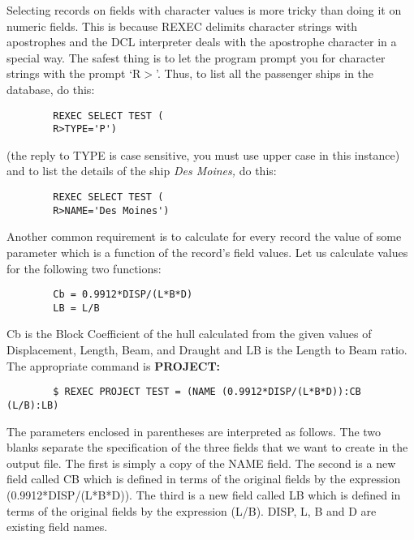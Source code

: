Selecting records on fields with character values is more tricky than doing it
on numeric fields.
This is because REXEC delimits character strings with apostrophes and the DCL
interpreter deals with the apostrophe character in a special way.
The safest thing is to let the program prompt you for character strings with
the prompt `R$>$'.
Thus, to list all the passenger ships in the database, do this:
\begin{verbatim}
        REXEC SELECT TEST (
        R>TYPE='P')
\end{verbatim}
(the reply to TYPE is case sensitive, you must use upper case in this instance)
and to list the details of the ship {\em Des Moines,} do this:
\begin{verbatim}
        REXEC SELECT TEST (
        R>NAME='Des Moines')
\end{verbatim}
Another common requirement is to calculate for every record the value of some
parameter which is a function of the record's field values.
Let us calculate values for the following two functions:
\begin{verbatim}
        Cb = 0.9912*DISP/(L*B*D)
        LB = L/B
\end{verbatim}
Cb is the Block Coefficient of the hull calculated from the given values of
Displacement, Length, Beam, and Draught and LB is the Length to Beam ratio.
The appropriate command is {\bf PROJECT:}
\begin{verbatim}
        $ REXEC PROJECT TEST = (NAME (0.9912*DISP/(L*B*D)):CB (L/B):LB)
\end{verbatim}
The parameters enclosed in parentheses are interpreted as follows.
The two blanks separate the specification of the three fields that we want to
create in the output file.
The first is simply a copy of the NAME field.
The second is a new field called CB which is defined in terms of the original
fields by the expression (0.9912*DISP/(L*B*D)).
The third is a new field called LB which is defined in terms of the original
fields by the expression (L/B).
DISP, L, B and D are existing field names.

